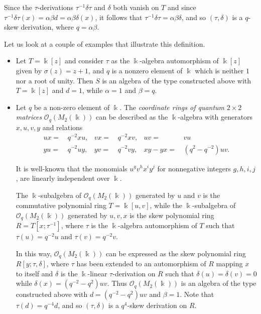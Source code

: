 \documentclass{amsart}
\theoremstyle{definition}
\theoremstyle{remark}
\numberwithin{equation}{section}
\begin{document}
Since the $\tau$-derivations $\tau^{-1}\delta \tau$ and $\delta$ both vanish on $T$ and since $\tau^{-1}\delta \tau(x) = \alpha \beta d = \alpha \beta \delta(x)$, it follows that $\tau^{-1} \delta \tau = \alpha \beta \delta$, and so $(\tau, \delta)$ is a $q$-skew derivation, where $q = \alpha \beta$.

Let us look at a couple of examples that illustrate this definition.
\begin{itemize}
\item Let $T = \Bbbk[z]$ and consider $\tau$ as the $\Bbbk$-algebra automorphism of $\Bbbk[z]$ given by $\sigma(z) = z+1$, and $q$ is a nonzero element of $\Bbbk$ which is neither $1$ nor a root of unity. Then $S$ is an algebra of the type constructed above with $T = \Bbbk[z]$ and $d=1$, while $\alpha = 1$ and $\beta = q$.

\item Let $q$ be a non-zero element of $\Bbbk$. The {\em coordinate rings of quantum} $2\times 2$ {\em matrices} $\mathcal{O}_q(M_2(\Bbbk))$ can be described as the $\Bbbk$-algebra with generators $x, u, v, y$ and relations
\begin{align*}
        ux = &\, q^{-2}xu, & vx = &\, q^{-2}xv, & uv = &\, vu \\
        yu = &\, q^{-2}uy, & yv = &\, q^{-2}vy, & xy - yx = &\, (q^2 - q^{-2})uv.
\end{align*}

It is well-known that the monomials $u^{g} v^{h} x^{i} y^{j}$ for nonnegative integers $g, h, i, j$, are linearly independent over $\Bbbk$.

The $\Bbbk$-subalgebra of $\mathcal{O}_q(M_2(\Bbbk))$ generated by $u$ and $v$ is the commutative polynomial ring $T = \Bbbk[u, v]$, while the $\Bbbk$-subalgebra of $\mathcal{O}_q(M_2(\Bbbk))$ generated by $u, v, x$ is the skew polynomial ring $R = T[x; \tau^{-1}]$, where $\tau$ is the $\Bbbk$-algebra automorphism of $T$ such that $\tau(u) = q^{-2}u$ and $\tau(v) = q^{-2}v$. 

In this way, $\mathcal{O}_q(M_2(\Bbbk))$ can be expressed as the skew polynomial ring $R[y; \tau, \delta]$, where $\tau$ has been extended to an automorphism of $R$ mapping $x$ to itself and $\delta$ is the $\Bbbk$-linear $\tau$-derivation on $R$ such that $\delta(u) = \delta(v) = 0$ while $\delta(x) = (q^{-2} - q^2)uv$. Thus $\mathcal{O}_q(M_2(\Bbbk))$ is an algebra of the type constructed above with $d = (q^{-2} - q^2)uv$ and $\beta = 1$. Note that $\tau(d) = q^{-4}d$, and so $(\tau, \delta)$ is a $q^4$-skew derivation on $R$.


\end{itemize}
\end{document}
